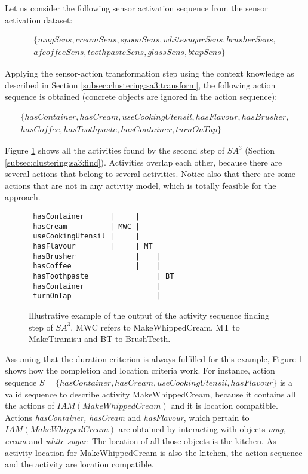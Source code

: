 Let us consider the following sensor activation sequence from the sensor activation dataset:

\begin{equation*}
\begin{split}
 \{mugSens, creamSens, spoonSens, whitesugarSens, brusherSens, \\ 
 afcof\!feeSens, toothpasteSens, glassSens, btapSens\}
\end{split}  
\end{equation*}

Applying the sensor-action transformation step using the context knowledge as described in Section \ref{subsec:clustering:sa3:transform}, the following action sequence is obtained (concrete objects are ignored in the action sequence):

\begin{equation*}
\begin{split}
 \{hasContainer, hasCream, useCookingUtensil, hasFlavour, hasBrusher, \\ 
 hasCof\!fee, hasToothpaste, hasContainer, turnOnTap\}
\end{split}  
\end{equation*}

Figure \ref{fig:overlap-l} shows all the activities found by the second step of $SA^3$ (Section \ref{subsec:clustering:sa3:find}). Activities overlap each other, because there are several actions that belong to several activities. Notice also that there are some actions that are not in any activity model, which is totally feasible for the approach.

\begin{figure}[htbp]
 \begin{small}
\begin{lstlisting}
 hasContainer      |     |
 hasCream          | MWC |
 useCookingUtensil |     |
 hasFlavour        |     | MT 
 hasBrusher              |    |
 hasCoffee               |    |
 hasToothpaste                | BT
 hasContainer                 |
 turnOnTap                    |
\end{lstlisting}
\caption{Illustrative example of the output of the activity sequence finding step of $SA^3$. MWC refers to MakeWhippedCream, MT to MakeTiramisu  and BT to BrushTeeth.}
\label{fig:overlap-l}
\end{small}
\end{figure}

Assuming that the duration criterion is always fulfilled for this example, Figure \ref{fig:overlap-l} shows how the completion and location criteria work. For instance, action sequence $S = \{hasContainer, hasCream, useCookingUtensil, hasFlavour\}$ is a valid sequence to describe activity MakeWhippedCream, because it contains all the actions of $IAM(MakeWhippedCream)$ and it is location compatible. Actions \textit{hasContainer, hasCream} and \textit{hasFlavour}, which pertain to $IAM(MakeWhippedCream)$ are obtained by interacting with objects \textit{mug, cream} and \textit{white-sugar}. The location of all those objects is the kitchen. As activity location for MakeWhippedCream is also the kitchen, the action sequence and the activity are location compatible.


